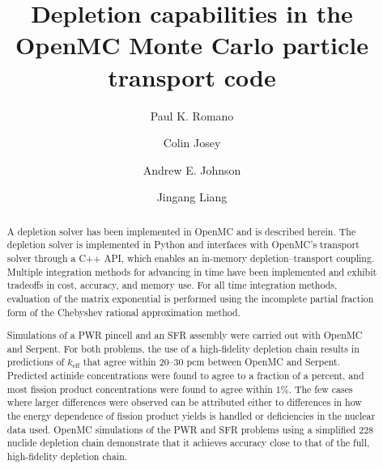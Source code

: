 \documentclass[3p,authoryear]{elsarticle}
\begin{document}
\title{Depletion capabilities in the OpenMC Monte Carlo particle transport code}

\author[anl]{Paul K. Romano}

\author[lanl]{Colin Josey}

\author[gatech]{Andrew E. Johnson}

\author[tsinghua]{Jingang Liang}

\address[anl]{Argonne National Laboratory, 9700 S. Cass Ave, Lemont, IL 60439, United States}
\address[lanl]{Los Alamos National Laboratory, P.O. Box 1663, Los Alamos, NM 87545, United States}
\address[gatech]{Georgia Institute of Technology, 770 State St NW, Atlanta, GA 30318, United States}
\address[tsinghua]{Institute of Nuclear and New Energy Technology, Tsinghua University, Beijing, China}

\begin{abstract}
  A depletion solver has been implemented in OpenMC and is described herein. The
  depletion solver is implemented in Python and interfaces with OpenMC's
  transport solver through a C++ API, which enables an in-memory
  depletion--transport coupling. Multiple integration methods for advancing in
  time have been implemented and exhibit tradeoffs in cost, accuracy, and memory
  use. For all time integration methods, evaluation of the matrix exponential is
  performed using the incomplete partial fraction form of the Chebyshev rational
  approximation method.

  Simulations of a PWR pincell and an SFR assembly were carried out with OpenMC
  and Serpent. For both problems, the use of a high-fidelity depletion chain
  results in predictions of $k_\text{eff}$ that agree within 20--30 pcm between
  OpenMC and Serpent. Predicted actinide concentrations were found to agree to a
  fraction of a percent, and most fission product concentrations were found to
  agree within 1\%. The few cases where larger differences were observed can be
  attributed either to differences in how the energy dependence of fission
  product yields is handled or deficiencies in the nuclear data used. OpenMC
  simulations of the PWR and SFR problems using a simplified 228 nuclide
  depletion chain demonstrate that it achieves accuracy close to that of the
  full, high-fidelity depletion chain.
\end{abstract}
\end{document}
